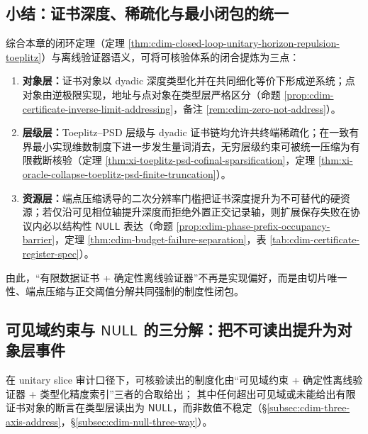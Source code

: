 \subsection{小结：证书深度、稀疏化与最小闭包的统一}\label{subsec:cdim-offline-verifier-summary}
综合本章的闭环定理（定理 \ref{thm:cdim-closed-loop-unitary-horizon-repulsion-toeplitz}）与离线验证器语义，可将可核验体系的闭合提炼为三点：
\begin{enumerate}
  \item \textbf{对象层：}证书对象以 dyadic 深度类型化并在共同细化等价下形成逆系统；点对象由逆极限实现，地址与点对象在类型层严格区分（命题 \ref{prop:cdim-certificate-inverse-limit-addressing}，备注 \ref{rem:cdim-zero-not-address}）。
  \item \textbf{层级层：}Toeplitz--PSD 层级与 dyadic 证书链均允许共终端稀疏化；在一致有界最小实现维数制度下进一步发生量词消去，无穷层级约束可被统一压缩为有限截断核验（定理 \ref{thm:xi-toeplitz-psd-cofinal-sparsification}，定理 \ref{thm:xi-oracle-collapse-toeplitz-psd-finite-truncation}）。
  \item \textbf{资源层：}端点压缩诱导的二次分辨率门槛把证书深度提升为不可替代的硬资源；若仅沿可见相位轴提升深度而拒绝外置正交记录轴，则扩展保存失败在协议内必以结构性 \(\mathsf{NULL}\) 表达（命题 \ref{prop:cdim-phase-prefix-occupancy-barrier}，定理 \ref{thm:cdim-budget-failure-separation}，表 \ref{tab:cdim-certificate-register-spec}）。
\end{enumerate}
由此，“有限数据证书 + 确定性离线验证器”不再是实现偏好，而是由切片唯一性、端点压缩与正交阈值分解共同强制的制度性闭包。

\subsection{可见域约束与 \texorpdfstring{$\mathsf{NULL}$}{NULL} 的三分解：把不可读出提升为对象层事件}\label{subsec:cdim-visible-null-trichotomy}
在 unitary slice 审计口径下，可核验读出的制度化由“可见域约束 + 确定性离线验证器 + 类型化精度索引”三者的合取给出；
其中任何超出可见域或未能给出有限证书对象的断言在类型层读出为 \(\mathsf{NULL}\)，而非数值不稳定（\S\ref{subsec:cdim-three-axis-address}，\S\ref{subsec:cdim-null-three-way}）。

